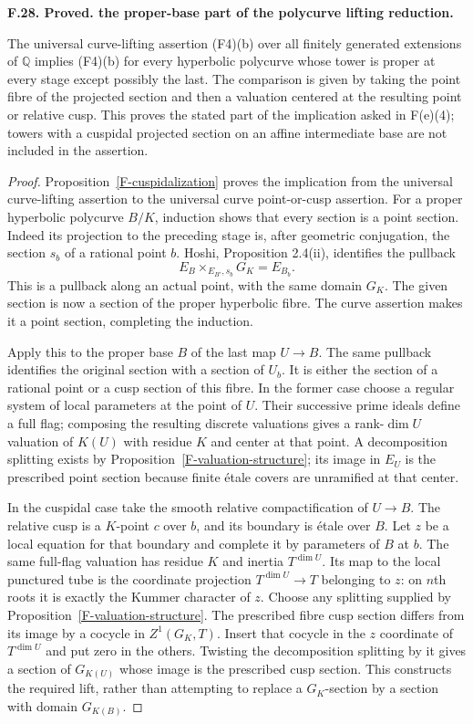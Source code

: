 \documentclass[11pt,oneside]{article}
\makeatletter
\newcounter{statementanchor}
\newenvironment{statement}[3]{%
 \refstepcounter{statementanchor}\def\@currentlabel{#1}%
 \par\addvspace{9pt}\noindent
 \textbf{#1. #2. #3.}\par\nobreak\noindent\ignorespaces
}{\par\addvspace{5pt}}
\makeatother
\begin{document}
\begin{statement}{F.28}{Proved}{the proper-base part of the polycurve lifting reduction}
\label{st:F.28}
\label{F-proper-polycurve-lifting}
The universal curve-lifting assertion (F4)(b) over all finitely
generated extensions of $\mathbb Q$ implies (F4)(b) for every
hyperbolic polycurve whose tower is proper at every stage except
possibly the last. The comparison is given by taking the point
fibre of the projected section and then a valuation centered at
the resulting point or relative cusp. This proves the stated
part of the implication asked in F(e)(4); towers with a
cuspidal projected section on an affine intermediate base are
not included in the assertion.
\end{statement}
\begin{proof}
Proposition~\ref{F-cuspidalization} proves the implication from
the universal curve-lifting assertion to the universal curve
point-or-cusp assertion. For a proper hyperbolic polycurve
$B/K$, induction shows that every section is a point section.
Indeed its projection to the preceding stage is, after geometric
conjugation, the section $s_b$ of a rational point $b$. Hoshi,
Proposition 2.4(ii), identifies the pullback
\[
 E_B\times_{E_{B'},s_b}G_K=E_{B_b}.
\]
This is a pullback along an actual point, with the same domain
$G_K$. The given section is now a section of the proper
hyperbolic fibre. The curve assertion makes it a point section,
completing the induction.

Apply this to the proper base $B$ of the last map $U\to B$.
The same pullback identifies the original section with a section
of $U_b$. It is either the section of a rational point or a cusp
section of this fibre. In the former case choose a regular system
of local parameters at the point of $U$. Their successive prime
ideals define a full flag; composing the resulting discrete
valuations gives a rank-$\dim U$ valuation of $K(U)$ with
residue $K$ and center at that point. A decomposition splitting
exists by Proposition~\ref{F-valuation-structure}; its image in
$E_U$ is the prescribed point section because finite \'etale
covers are unramified at that center.

In the cuspidal case take the smooth relative compactification
of $U\to B$. The relative cusp is a $K$-point $c$ over $b$,
and its boundary is \'etale over $B$. Let $z$ be a local
equation for that boundary and complete it by parameters of
$B$ at $b$. The same full-flag valuation has residue $K$ and
inertia $T^{\dim U}$. Its map to the local punctured tube is
the coordinate projection $T^{\dim U}\to T$ belonging to
$z$: on $n$th roots it is exactly the Kummer character of $z$.
Choose any splitting supplied by
Proposition~\ref{F-valuation-structure}. The prescribed fibre
cusp section differs from its image by a cocycle in
$Z^1(G_K,T)$. Insert that cocycle in the
$z$ coordinate of $T^{\dim U}$ and put zero in the others.
Twisting the decomposition splitting by it gives a section of
$G_{K(U)}$ whose image is the prescribed cusp section. This
constructs the required lift, rather than attempting to replace
a $G_K$-section by a section with domain $G_{K(B)}$.
\end{proof}
\end{document}
